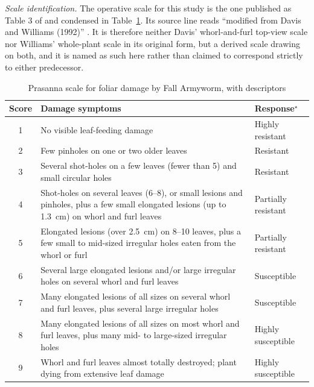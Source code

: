 \documentclass{icsthesis}
\begin{document}
\begin{mainmatter}
				\textit{Scale identification.} The operative scale for this study is the one
				published as Table 3 of \citet{prasanna2018} and condensed in
				Table~\ref{tab:prasanna}. Its source line reads ``modified from Davis and Williams
				(1992)'' \citep{davis1992}. It is therefore neither Davis' whorl-and-furl top-view
				scale nor Williams' whole-plant scale in its original form, but a derived scale
				drawing on both, and it is named as such here rather than claimed to correspond
				strictly to either predecessor.

				\begin{table}[htbp]
				\vspace{4ex}
				\centering
					\caption{Prasanna scale for foliar damage by Fall Armyworm, with descriptors}
					\label{tab:prasanna}
					\singlespacing\footnotesize
					\begin{tabular}{cp{9.2cm}l}
					\hline
					\hline
					Score & Damage symptoms & Response$^{\star}$ \\ \hline
					1 & No visible leaf-feeding damage & Highly resistant \\[3pt]
					2 & Few pinholes on one or two older leaves & Resistant \\[3pt]
					3 & Several shot-holes on a few leaves (fewer than 5) and small circular holes &
					Resistant \\[3pt]
					4 & Shot-holes on several leaves (6--8), or small lesions and pinholes, plus a
					few small elongated lesions (up to 1.3~cm) on whorl and furl leaves & Partially
					resistant \\[3pt]
					5 & Elongated lesions (over 2.5~cm) on 8--10 leaves, plus a few small to
					mid-sized irregular holes eaten from the whorl or furl & Partially resistant
					\\[3pt]
					6 & Several large elongated lesions and/or large irregular holes on several
					whorl and furl leaves & Susceptible \\[3pt]
					7 & Many elongated lesions of all sizes on several whorl and furl leaves, plus
					several large irregular holes & Susceptible \\[3pt]
					8 & Many elongated lesions of all sizes on most whorl and furl leaves, plus many
					mid- to large-sized irregular holes & Highly susceptible \\[3pt]
					9 & Whorl and furl leaves almost totally destroyed; plant dying from extensive
					leaf damage & Highly susceptible \\ \hline\hline
					\end{tabular}


\end{table}
\end{mainmatter}
\end{document}
